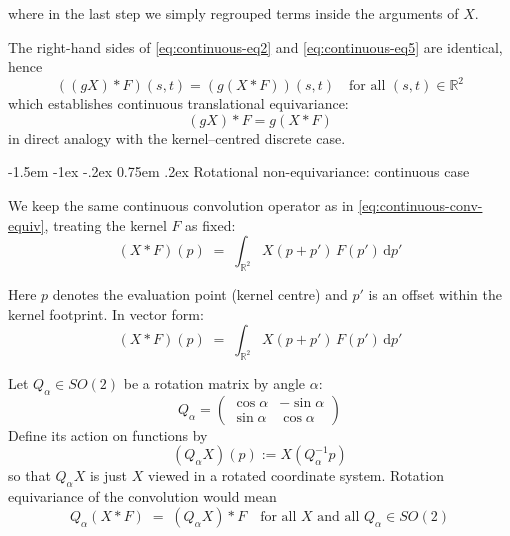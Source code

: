 \documentclass[12pt]{article}
\makeatletter
\renewcommand\subsection{\@startsection{subsection}{2}{\z@}%
                                     {-1.5em \@plus -1ex \@minus -.2ex}%
                                     {0.75em \@plus .2ex}%
                                     {\normalfont\large\bfseries}}
\makeatother
\begin{document}
  where in the last step we simply regrouped terms inside the arguments of $X$.
  
  The right-hand sides of \eqref{eq:continuous-eq2} and
  \eqref{eq:continuous-eq5} are identical, hence
  \[
  ((g X) * F)(s,t) = (g (X * F))(s,t)
  \quad\text{for all } (s,t) \in \mathbb{R}^2
  \]
  which establishes continuous translational equivariance:
  \begin{equation}
    (g X) * F = g (X * F)
  \end{equation}
  in direct analogy with the kernel--centred discrete case.
  
 



  


  \subsection{Rotational non-equivariance: continuous case}

  We keep the same continuous convolution operator as in
  \eqref{eq:continuous-conv-equiv}, treating the kernel $F$ as fixed:
  \begin{equation}
    \label{eq:continuous-conv-rot}
    (X * F)(p)
    \;=\;
    \int_{\mathbb{R}^2}
    X(p + p')\,
    F(p')\,\mathrm{d}p'
  \end{equation}





  Here $p$ denotes the evaluation point (kernel centre) and $p'$ is an offset within the kernel footprint.  In vector form:
  \begin{equation}
    (X * F)(p)
    \;=\;
    \int_{\mathbb{R}^2} X(p + p')\,F(p')\,\mathrm{d}p'
  \end{equation}
  
    Let $Q_\alpha \in SO(2)$ be a rotation matrix by angle $\alpha$:
  \begin{equation}
    \label{eq:rotation-matrix-def}
    Q_\alpha =
    \begin{pmatrix}
      \cos\alpha & -\sin\alpha \\
      \sin\alpha & \cos\alpha
    \end{pmatrix}
  \end{equation}
  Define its action on functions by
  \begin{equation}
    \label{eq:rotation-action}
    (Q_\alpha X)(p) := X(Q_\alpha^{-1} p)
  \end{equation}
  so that $Q_\alpha X$ is just $X$ viewed in a rotated coordinate system. Rotation
  equivariance of the convolution would mean
  \begin{equation}
    \label{eq:rotation-equivariance}
    Q_\alpha(X * F) \;=\; (Q_\alpha X) * F
    \quad\text{for all }X\text{ and all }Q_\alpha\in SO(2)
  \end{equation}
  
\end{document}
